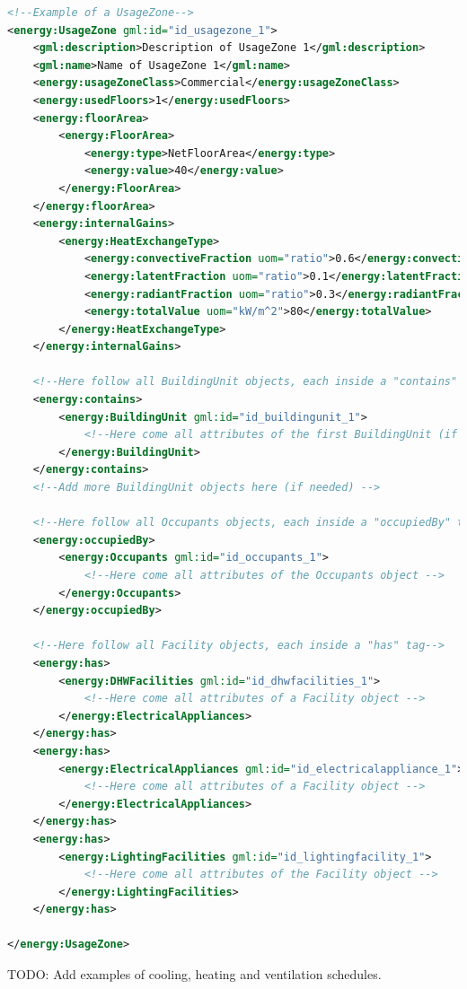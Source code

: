 \documentclass[a4paper,12pt]{article}
\begin{document}
\begin{lstlisting}[language=XML]
<!--Example of a UsageZone-->
<energy:UsageZone gml:id="id_usagezone_1">
    <gml:description>Description of UsageZone 1</gml:description>
    <gml:name>Name of UsageZone 1</gml:name>
    <energy:usageZoneClass>Commercial</energy:usageZoneClass>
    <energy:usedFloors>1</energy:usedFloors>
    <energy:floorArea>
        <energy:FloorArea>
            <energy:type>NetFloorArea</energy:type>
            <energy:value>40</energy:value>
        </energy:FloorArea>
    </energy:floorArea>
    <energy:internalGains>
        <energy:HeatExchangeType>
            <energy:convectiveFraction uom="ratio">0.6</energy:convectiveFraction>
            <energy:latentFraction uom="ratio">0.1</energy:latentFraction>
            <energy:radiantFraction uom="ratio">0.3</energy:radiantFraction>
            <energy:totalValue uom="kW/m^2">80</energy:totalValue>
        </energy:HeatExchangeType>
    </energy:internalGains>

    <!--Here follow all BuildingUnit objects, each inside a "contains" tag-->
    <energy:contains>
        <energy:BuildingUnit gml:id="id_buildingunit_1">
            <!--Here come all attributes of the first BuildingUnit (if needed) -->
        </energy:BuildingUnit>
    </energy:contains>
    <!--Add more BuildingUnit objects here (if needed) -->

    <!--Here follow all Occupants objects, each inside a "occupiedBy" tag-->
    <energy:occupiedBy>
        <energy:Occupants gml:id="id_occupants_1">
            <!--Here come all attributes of the Occupants object -->
        </energy:Occupants>
    </energy:occupiedBy>

    <!--Here follow all Facility objects, each inside a "has" tag-->
    <energy:has>
        <energy:DHWFacilities gml:id="id_dhwfacilities_1">
            <!--Here come all attributes of a Facility object -->
        </energy:ElectricalAppliances>
    </energy:has>
    <energy:has>
        <energy:ElectricalAppliances gml:id="id_electricalappliance_1">
            <!--Here come all attributes of a Facility object -->
        </energy:ElectricalAppliances>
    </energy:has>
    <energy:has>
        <energy:LightingFacilities gml:id="id_lightingfacility_1">
            <!--Here come all attributes of the Facility object -->
        </energy:LightingFacilities>
    </energy:has>

</energy:UsageZone>
\end{lstlisting}

TODO: Add examples of cooling, heating and ventilation schedules.
\end{document}
